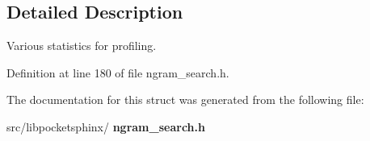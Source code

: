 \subsection{Detailed Description}
Various statistics for profiling. 

Definition at line 180 of file ngram\+\_\+search.\+h.



The documentation for this struct was generated from the following file\+:\begin{DoxyCompactItemize}
\item 
src/libpocketsphinx/\textbf{ ngram\+\_\+search.\+h}\end{DoxyCompactItemize}
